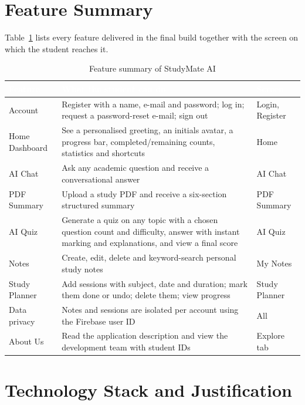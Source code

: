 \documentclass[12pt,a4paper,oneside]{report}
\begin{document}
\section{Feature Summary}

Table~\ref{tab:features} lists every feature delivered in the final build together with the screen on which the student reaches it.

\begin{table}[H]
\centering
\caption{Feature summary of StudyMate AI}
\label{tab:features}
\small
\begin{tabularx}{\textwidth}{@{}p{3.1cm}Xp{2.6cm}@{}}
\toprule
\rowcolor{tblhead} \textcolor{white}{\textbf{Feature}} &
\textcolor{white}{\textbf{What the student can do}} &
\textcolor{white}{\textbf{Screen}} \\
\midrule
Account         & Register with a name, e-mail and password; log in; request a
                  password-reset e-mail; sign out & Login, Register \\
Home Dashboard  & See a personalised greeting, an initials avatar, a progress bar,
                  completed/remaining counts, statistics and shortcuts & Home \\
AI Chat         & Ask any academic question and receive a conversational answer & AI Chat \\
PDF Summary     & Upload a study PDF and receive a six-section structured summary & PDF Summary \\
AI Quiz         & Generate a quiz on any topic with a chosen question count and
                  difficulty, answer with instant marking and explanations, and
                  view a final score & AI Quiz \\
Notes           & Create, edit, delete and keyword-search personal study notes & My Notes \\
Study Planner   & Add sessions with subject, date and duration; mark them done or
                  undo; delete them; view progress & Study Planner \\
Data privacy    & Notes and sessions are isolated per account using the Firebase
                  user ID & All \\
About Us        & Read the application description and view the development team
                  with student IDs & Explore tab \\
\bottomrule
\end{tabularx}
\end{table}

\section{Technology Stack and Justification}
\end{document}
